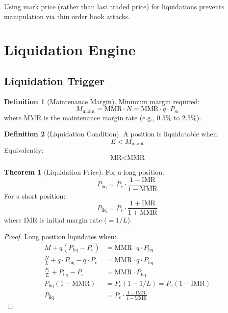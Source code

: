 \documentclass[11pt,a4paper]{article}
\theoremstyle{definition}
\newtheorem{definition}{Definition}
\newtheorem{theorem}{Theorem}
\begin{document}
Using mark price (rather than last traded price) for liquidations prevents manipulation via thin order book attacks.

\section{Liquidation Engine}

\subsection{Liquidation Trigger}

\begin{definition}[Maintenance Margin]
Minimum margin required:
\begin{equation}
M_{\text{maint}} = \text{MMR} \cdot N = \text{MMR} \cdot q \cdot P_m
\end{equation}
where MMR is the maintenance margin rate (e.g., 0.5\% to 2.5\%).
\end{definition}

\begin{definition}[Liquidation Condition]
A position is liquidatable when:
\begin{equation}
E < M_{\text{maint}}
\end{equation}
Equivalently:
\begin{equation}
\text{MR} < \text{MMR}
\end{equation}
\end{definition}

\begin{theorem}[Liquidation Price]
For a long position:
\begin{equation}
P_{\text{liq}} = P_e \cdot \frac{1 - \text{IMR}}{1 - \text{MMR}}
\end{equation}
For a short position:
\begin{equation}
P_{\text{liq}} = P_e \cdot \frac{1 + \text{IMR}}{1 + \text{MMR}}
\end{equation}
where IMR is initial margin rate ($= 1/L$).
\end{theorem}

\begin{proof}
Long position liquidates when:
\begin{align}
M + q(P_{\text{liq}} - P_e) &= \text{MMR} \cdot q \cdot P_{\text{liq}} \\
\frac{N}{L} + q \cdot P_{\text{liq}} - q \cdot P_e &= \text{MMR} \cdot q \cdot P_{\text{liq}} \\
\frac{P_e}{L} + P_{\text{liq}} - P_e &= \text{MMR} \cdot P_{\text{liq}} \\
P_{\text{liq}}(1 - \text{MMR}) &= P_e(1 - 1/L) = P_e(1 - \text{IMR}) \\
P_{\text{liq}} &= P_e \cdot \frac{1 - \text{IMR}}{1 - \text{MMR}}
\end{align}
\end{proof}
\end{document}
